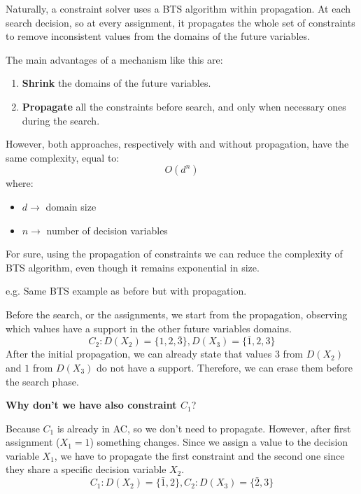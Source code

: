 Naturally, a constraint solver uses a BTS algorithm within propagation. At each search decision, so at every assignment, it propagates the whole set of
constraints to remove inconsistent values from the domains of the future variables. \vspace{7pt}

The main advantages of a mechanism like this are:
\begin{enumerate}
    \item \textbf{Shrink} the domains of the future variables.
    \item \textbf{Propagate} all the constraints before search, and only when necessary ones during the search.
\end{enumerate}

However, both approaches, respectively with and without propagation, have the same complexity, equal to: 
$$ O(d^n) $$
where:
\begin{itemize}
    \renewcommand{\labelitemi}{-}
    \item $d \rightarrow$ domain size
    \item $n \rightarrow$ number of decision variables
\end{itemize}
For sure, using the propagation of constraints we can reduce the complexity of BTS algorithm, even though it remains exponential in size.
\begin{example}
    e.g. Same BTS example as before but with propagation. \vspace{7pt}

    Before the search, or the assignments, we start from the propagation, observing which values have a support in the other future variables domains.
    $$ C_2 : D(X_2) = \{1, 2, \bar{3}\}, D(X_3) = \{\bar{1}, 2, 3\}$$
    After the initial propagation, we can already state that values $3$ from $D(X_2)$ and $1$ from $D(X_3)$ do not have a support. Therefore, we can erase them 
    before the search phase. \vspace{7pt}

    \textbf{Why don't we have also constraint $C_1$}? 

    Because $C_1$ is already in AC, so we don't need to propagate. However, after first assignment ($X_1 = 1$) something changes. Since we assign a value 
    to the decision variable $X_1$, we have to propagate the first constraint and the second one since they share a specific decision variable $X_2$. 
    $$ C_1 : D(X_2) = \{\bar{1}, 2\}, C_2 : D(X_3) = \{\bar{2}, 3\} $$
\end{example}